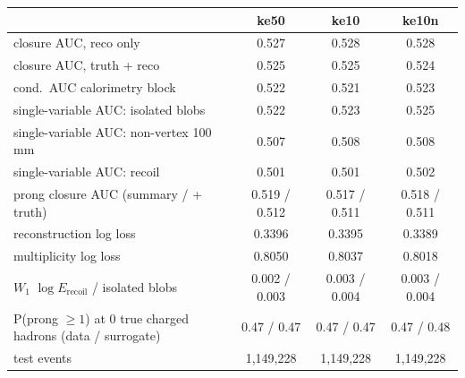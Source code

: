 \begin{tabular}{lccc}
\toprule
 & ke50 & ke10 & ke10n \\
\midrule
closure AUC, reco only & 0.527 & 0.528 & 0.528 \\
closure AUC, truth + reco & 0.525 & 0.525 & 0.524 \\
cond.\ AUC calorimetry block & 0.522 & 0.521 & 0.523 \\
single-variable AUC: isolated blobs & 0.522 & 0.523 & 0.525 \\
single-variable AUC: non-vertex 100\,mm & 0.507 & 0.508 & 0.508 \\
single-variable AUC: recoil & 0.501 & 0.501 & 0.502 \\
prong closure AUC (summary / + truth) & 0.519 / 0.512 & 0.517 / 0.511 & 0.518 / 0.511 \\
reconstruction log loss & 0.3396 & 0.3395 & 0.3389 \\
multiplicity log loss & 0.8050 & 0.8037 & 0.8018 \\
$W_1$ $\log E_\mathrm{recoil}$ / isolated blobs & 0.002 / 0.003 & 0.003 / 0.004 & 0.003 / 0.004 \\
P(prong $\ge 1$) at 0 true charged hadrons (data / surrogate) & 0.47 / 0.47 & 0.47 / 0.47 & 0.47 / 0.48 \\
test events & 1,149,228 & 1,149,228 & 1,149,228 \\
\bottomrule
\end{tabular}
